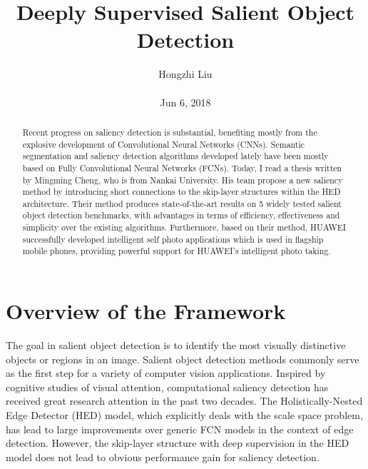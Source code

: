 \documentclass[10pt,twocolumn,letterpaper]{article}
\title{Deeply Supervised Salient Object Detection}
\author{Hongzhi Liu\\\\
Jun 6, 2018}
\begin{document}
\maketitle
\begin{abstract}
	Recent progress on saliency detection is substantial, benefiting mostly from the explosive development of Convolutional Neural Networks (CNNs). Semantic segmentation and saliency detection algorithms developed lately have been mostly based on Fully Convolutional Neural Networks (FCNs). Today, I read a thesis written by Mingming Cheng, who is from Nankai University. His team propose a new saliency method by introducing short connections to the skip-layer structures within the HED architecture. Their method produces state-of-the-art results on 5 widely tested salient object detection benchmarks, with advantages in terms of efficiency, effectiveness and simplicity over the existing algorithms. Furthermore, based on their method, HUAWEI successfully developed intelligent self photo applications which is used in flagship mobile phones, providing powerful support for HUAWEI's intelligent photo taking.
\end{abstract}
\section{Overview of the Framework}
The goal in salient object detection is to identify the most visually distinctive objects or regions in an image. Salient object detection methods commonly serve as the first step for a variety of computer vision applications. Inspired by cognitive studies of visual attention, computational saliency detection has received great research attention in the past two decades. The Holistically-Nested Edge Detector (HED) \cite{Saining2015Holistically} model, which explicitly deals with the scale space problem, has lead to large improvements over generic FCN models in the context of edge detection. However, the skip-layer structure with deep supervision in the HED model does not lead to obvious performance gain for saliency detection.
\end{document}
